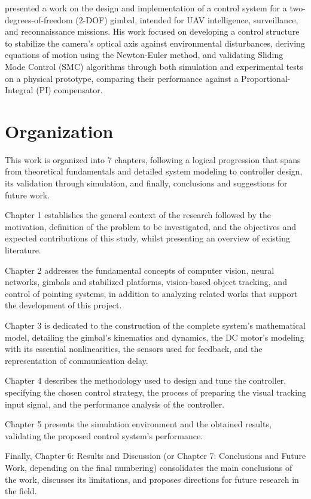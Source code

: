  presented a work on the design and implementation of a control system for a two-degrees-of-freedom (2-DOF) gimbal, intended for UAV intelligence, surveillance, and reconnaissance missions. His work focused on developing a control structure to stabilize the camera's optical axis against environmental disturbances, deriving equations of motion using the Newton-Euler method, and validating Sliding Mode Control (SMC) algorithms through both simulation and experimental tests on a physical prototype, comparing their performance against a Proportional-Integral (PI) compensator.

\section{Organization}
This work is organized into 7 chapters, following a logical progression that spans from theoretical fundamentals and detailed system modeling to controller design, its validation through simulation, and finally, conclusions and suggestions for future work.

Chapter 1 establishes the general context of the research followed by the motivation, definition of the problem to be investigated, and the objectives and expected contributions of this study, whilst presenting an overview of existing literature.

Chapter 2 addresses the fundamental concepts of computer vision, neural networks, gimbals and stabilized platforms, vision-based object tracking, and control of pointing systems, in addition to analyzing related works that support the development of this project.

Chapter 3 is dedicated to the construction of the complete system's mathematical model, detailing the gimbal's kinematics and dynamics, the DC motor's modeling with its essential nonlinearities, the sensors used for feedback, and the representation of communication delay.

Chapter 4 describes the methodology used to design and tune the controller, specifying the chosen control strategy, the process of preparing the visual tracking input signal, and the performance analysis of the controller.

Chapter 5 presents the simulation environment and the obtained results, validating the proposed control system's performance.

Finally, Chapter 6: Results and Discussion (or Chapter 7: Conclusions and Future Work, depending on the final numbering) consolidates the main conclusions of the work, discusses its limitations, and proposes directions for future research in the field.